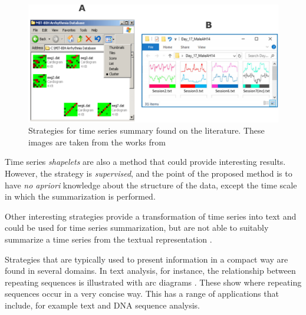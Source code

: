 \begin{figure}[t]
    \centering
    \includegraphics[width=0.8\linewidth]{Figures/keogh_examples.pdf}
    \caption{Strategies for time series summary found on the literature. These images are taken from the works from \cite{snippets, bitmap}}
    \label{fig:keogh_strat}
\end{figure}

Time series \textit{shapelets} are also a method that could provide interesting results. However, the strategy is \textit{supervised}, and the point of the proposed method is to have \textit{no apriori} knowledge about the structure of the data, except the time scale in which the summarization is performed. 
\par
Other interesting strategies provide a transformation of time series into text and could be used for time series summarization, but are not able to suitably summarize a time series from the textual representation \cite{ssts, sax}.



Strategies that are typically used to present information in a compact way are found in several domains. In text analysis, for instance, the relationship between repeating sequences is illustrated with arc diagrams \cite{bitmap, arcplots}. These show where repeating sequences occur in a very concise way. This has a range of applications that include, for example text and DNA sequence analysis.

